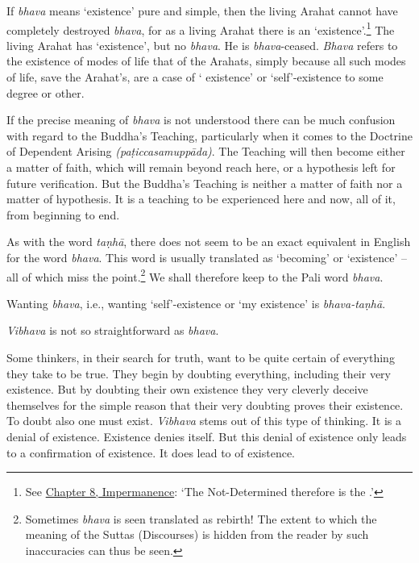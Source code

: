 If \emph{bhava} means `existence' pure and simple, then the living Arahat cannot have completely destroyed \emph{bhava}, for as a living Arahat there is an `existence'.\footnote{See \href{ch-08-impermanence.xml\#living-experience}{Chapter 8, Impermanence}: `The Not-Determined therefore is the .'} The living Arahat has `existence', but no \emph{bhava}. He is \emph{bhava}-ceased. \emph{Bhava} refers to the existence of  modes of life  that of the Arahats, simply because all such modes of life, save the Arahat's, are a case of ` existence' or `self'-existence to some degree or other.

If the precise meaning of \emph{bhava} is not understood there can be much confusion with regard to the Buddha's Teaching, particularly when it comes to the Doctrine of Dependent Arising \emph{(paṭiccasamuppāda)}. The Teaching will then become either a matter of faith, which will remain beyond reach here, or a hypothesis left for future verification. But the Buddha's Teaching is neither a matter of faith nor a matter of hypothesis. It is a teaching to be experienced here and now, all of it, from beginning to end.

\enlargethispage*{\baselineskip}

As with the word \emph{taṇhā}, there does not seem to be an exact equivalent in English for the word \emph{bhava}. This word is usually translated as `becoming' or `existence' -- all of which miss the point.\footnote{Sometimes \emph{bhava} is seen translated as rebirth! The extent to which the meaning of the Suttas (Discourses) is hidden from the reader by such inaccuracies can thus be seen.} We shall therefore keep to the Pali word \emph{bhava}.

Wanting \emph{bhava}, i.e., wanting `self'-existence or `my existence' is \emph{bhava-taṇhā}.

\emph{Vibhava} is not so straightforward as \emph{bhava}.

Some thinkers, in their search for truth, want to be quite certain of everything they take to be true. They begin by doubting everything, including their very existence. But by doubting their own existence they very cleverly deceive themselves for the simple reason that their very doubting proves their existence. To doubt also one must exist. \emph{Vibhava} stems out of this type of thinking. It is a denial of existence. Existence denies itself. But this denial of existence only leads to a confirmation of existence. It does  lead to  of existence.

